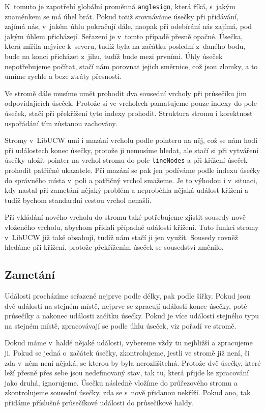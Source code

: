 K~tomuto je zapotřebí globální proměnná \verb|anglesign|, která říká, s~jakým
znaménkem se má úhel brát. Pokud totiž srovnáváme úsečky při přidávání, zajímá
nás, v~jakém úhlu pokračují dále, naopak při odebírání nás zajímá, pod jakým
úhlem přicházejí. Seřazení je v~tomto případě přesně opačné. Úsečka, která
mířila nejvíce k~severu, tudíž byla na začátku poslední z~daného bodu, bude na
konci přicházet z~jihu, tudíž bude mezi prvními. Úhly úseček nepotřebujeme
počítat, stačí nám porovnat jejich směrnice, což jsou zlomky, a to umíme rychle
a beze ztráty přesnosti.

Ve stromě dále musíme umět prohodit dva sousední vrcholy při průsečíku jim
odpovídajících úseček. Protože si ve vrcholech pamatujeme pouze indexy do pole
úseček, stačí při překřížení tyto indexy prohodit. Struktura stromu i korektnost
uspořádání tím zůstanou zachovány.

Stromy v~LibUCW umí i mazání vrcholu podle pointeru na něj, což se nám hodí při
událostech konec úsečky, protože ji nemusíme hledat, ale stačí si při vytváření
úsečky uložit pointer na vrchol stromu do pole \verb|lineNodes| a při křížení
úseček prohodit patřičné ukazatele. Při mazání se pak jen podíváme podle indexu
úsečky do správného místa v~poli a patřičný vrchol smažeme. Je to výhodou i
v~situaci, kdy nastal při zametání nějaký problém a neproběhla nějaká událost
křížení a tudíž bychom standardní cestou vrchol nenašli.

Při vkládání nového vrcholu do stromu také potřebujeme zjistit sousedy nově
vloženého vrcholu, abychom přidali případné události křížení. Tuto funkci stromy
v~LibUCW již také obsahují, tudíž nám stačí ji jen využít. Sousedy rovněž
hledáme při křížení, protože překřížením úseček se sousedství změnilo.


\subsection{Zametání}
Události procházíme seřazené nejprve podle délky, pak podle šířky. Pokud jsou
dvě události na stejném místě, nejprve se zpracují události konce úsečky, poté
průsečíky a nakonec události začítku úsečky. Pokud je více událostí stejného
typu na stejném místě, zpracovávají se podle úhlu úseček, viz pořadí ve stromě. 

Dokud máme v~haldě nějaké události, vybereme vždy tu nejbližší a zpracujeme ji.
Pokud se jedná o~začátek úsečky, zkontrolujeme, jestli ve stromě již není, či
zda v~něm není nějaká, se kterou by byla nerozlišitelná. Protože dvě úsečky,
které leží přesně přes sebe jsou nedefinovaný stav, tak tu, která přijde ke
zpracování jako druhá, ignorujeme. Úsečku následně vložíme do průřezového stromu
a zkontrolujeme sousední úsečky, zda se s~nově přidanou nekříží. Pokud ano, tak
přidáme příslušné průsečíkové události do průsečíkové haldy.

